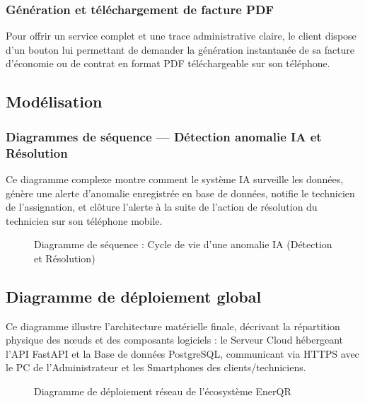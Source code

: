 \documentclass[12pt,a4paper]{report}
\begin{document}
\subsubsection{Génération et téléchargement de facture PDF}
Pour offrir un service complet et une trace administrative claire, le client dispose d'un bouton lui permettant de demander la génération instantanée de sa facture d'économie ou de contrat en format PDF téléchargeable sur son téléphone.

\subsection{Modélisation}
\subsubsection{Diagrammes de séquence — Détection anomalie IA et Résolution}
Ce diagramme complexe montre comment le système IA surveille les données, génère une alerte d'anomalie enregistrée en base de données, notifie le technicien de l'assignation, et clôture l'alerte à la suite de l'action de résolution du technicien sur son téléphone mobile.

\begin{figure}[H]
    \centering
    \vspace{5cm} %
    \caption{Diagramme de séquence : Cycle de vie d'une anomalie IA (Détection et Résolution)}
    \label{fig:seq_anomalie}
\end{figure}

\subsection{Diagramme de déploiement global}
Ce diagramme illustre l'architecture matérielle finale, décrivant la répartition physique des nœuds et des composants logiciels : le Serveur Cloud hébergeant l'API FastAPI et la Base de données PostgreSQL, communicant via HTTPS avec le PC de l'Administrateur et les Smartphones des clients/techniciens.

\begin{figure}[H]
    \centering
    \vspace{4cm} %
    \caption{Diagramme de déploiement réseau de l'écosystème EnerQR}
    \label{fig:deployment}
\end{figure}
\end{document}
